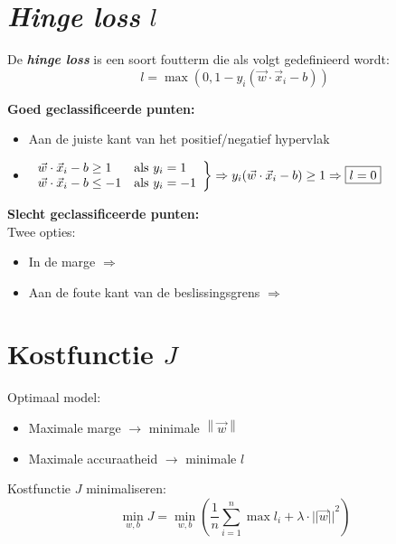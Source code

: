 \documentclass[kulak]{kulakposter}
\newcommand{\norm}[1]{\left\| #1 \right\|}
\renewcommand{\boxed}[1]{\text{\fboxsep=.3em\fbox{#1}}}
\begin{document}
\begin{multicols}{2}
	
	\section{\textit{Hinge loss} \(l\)}
	
	De \textbf{\textit{hinge loss}} is een soort foutterm die als volgt gedefinieerd wordt:
	\[l=\max{(0,1-y_i(\vec{w}\cdot\vec{x}_i-b))}\]
	
	\vspace{0.5cm}
	
		\textbf{Goed geclassificeerde punten:}
		\begin{itemize}
			\item Aan de juiste kant van het positief/negatief hypervlak
			\item 	\(\left. \begin{array}{ll}
				\vec{w}\cdot \vec{x}_i-b\geq 1 & \text{als } y_i=1 \\
				\vec{w}\cdot \vec{x}_i-b\leq -1 & \text{als } y_i=-1
			\end{array} \right\} \Rightarrow y_i(\vec{w}\cdot \vec{x}_i-b)\geq 1 \Rightarrow \boxed{$l=0$} \)
		\end{itemize}
		\vspace{0.5cm}
		\textbf{Slecht geclassificeerde punten:}\\
		Twee opties:
		\begin{itemize}
			\item In de marge \(\Rightarrow\) \boxed{$0<l\leq 1$}
			\item Aan de foute kant van de beslissingsgrens \(\Rightarrow\) \boxed{$l > 1$}
		\end{itemize}
	
\section{Kostfunctie \(J\)}
\begin{multicols}{2}
	Optimaal model:
	\begin{itemize}
		\item Maximale marge \(\rightarrow\) minimale \(\norm{\vec{w}}\)
		\item Maximale accuraatheid \(\rightarrow\) minimale \(l\)
	\end{itemize}
	\columnbreak
	Kostfunctie \(J\) minimaliseren:
	\[\min_{w,b}J=\min_{w,b}\left(\frac{1}{n} \sum_{i=1}^n{\max{l_i}} + \lambda\cdot{||\vec{w}||}^2\right)\]
\end{multicols}


\end{multicols}
\end{document}
